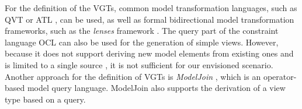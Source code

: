 For the definition of the VGTs, common model transformation languages, such as QVT \cite{omg_qvt} or ATL \cite{eclipse_atl}, can be used, as well as formal bidirectional model transformation frameworks, such as the \emph{lenses} framework \autocite{foster_combinators_2007}.
The query part of the constraint language OCL \cite{omg_ocl} can also be used for the generation of simple views.
However, because it does not support deriving new model elements from existing ones and is limited to a single source \metamodel, it is not sufficient for our envisioned scenario.
Another approach for the definition of VGTs is \emph{ModelJoin} \autocite{burger_model-join_2016}, which is an operator-based model query language.
ModelJoin also supports the derivation of a view type based on a query.

